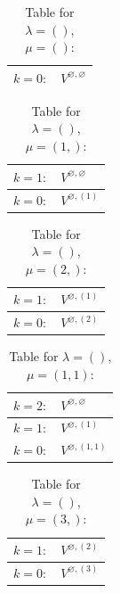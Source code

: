 \renewcommand{\arraystretch}{1.6} 
\begin{table}[H]
\centering
\caption{Table for $\lambda = ()$, $\mu = ()$:}
\begin{tabular}{|>{\centering\arraybackslash}p{15cm}|}
\hline
 $k = 0: \quad V^{\varnothing, \varnothing} $ \\ \hline
\end{tabular}
\end{table}

\renewcommand{\arraystretch}{1.6} 
\begin{table}[H]
\centering
\caption{Table for $\lambda = ()$, $\mu = (1,)$:}
\begin{tabular}{|>{\centering\arraybackslash}p{15cm}|}
\hline
 $k = 1: \quad V^{\varnothing, \varnothing} $ \\ \hline
 $k = 0: \quad V^{\varnothing, (1)} $ \\ \hline
\end{tabular}
\end{table}

\renewcommand{\arraystretch}{1.6} 
\begin{table}[H]
\centering
\caption{Table for $\lambda = ()$, $\mu = (2,)$:}
\begin{tabular}{|>{\centering\arraybackslash}p{15cm}|}
\hline
 $k = 1: \quad V^{\varnothing, (1)} $ \\ \hline
 $k = 0: \quad V^{\varnothing, (2)} $ \\ \hline
\end{tabular}
\end{table}

\renewcommand{\arraystretch}{1.6} 
\begin{table}[H]
\centering
\caption{Table for $\lambda = ()$, $\mu = (1, 1)$:}
\begin{tabular}{|>{\centering\arraybackslash}p{15cm}|}
\hline
 $k = 2: \quad V^{\varnothing, \varnothing} $ \\ \hline
 $k = 1: \quad V^{\varnothing, (1)} $ \\ \hline
 $k = 0: \quad V^{\varnothing, (1, 1)} $ \\ \hline
\end{tabular}
\end{table}

\renewcommand{\arraystretch}{1.6} 
\begin{table}[H]
\centering
\caption{Table for $\lambda = ()$, $\mu = (3,)$:}
\begin{tabular}{|>{\centering\arraybackslash}p{15cm}|}
\hline
 $k = 1: \quad V^{\varnothing, (2)} $ \\ \hline
 $k = 0: \quad V^{\varnothing, (3)} $ \\ \hline
\end{tabular}
\end{table}

